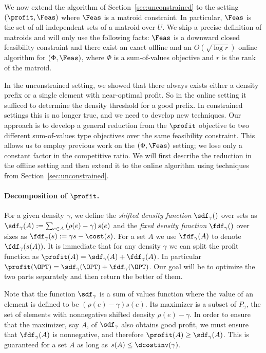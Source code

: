 We now extend the algorithm of Section~\ref{sec:unconstrained} to the
setting $(\profit, \Feas)$ where $\Feas$ is a matroid constraint. In
particular, $\Feas$ is the set of all independent sets of a matroid
over $U$. We skip a precise definition of matroids and will only use the following facts: $\Feas$ is a downward closed feasibility constraint and there exist an exact offline and an $O(\sqrt{\log r})$ online algorithm for
$(\Phi,\Feas)$, where $\Phi$ is a sum-of-values objective and $r$ is the rank of the matroid. 

In the unconstrained setting, we showed that there always exists either a density prefix or a single element with near-optimal profit. So in the online setting it sufficed to determine the density threshold for a good prefix. In constrained settings this is no longer true, and we need to develop new techniques. Our approach is to develop a general reduction from the $\profit$ objective to two different sum-of-values type objectives over the same feasibility constraint. This allows us to employ previous work on the $(\Phi,\Feas)$ setting; we lose only a constant factor in the competitive ratio. We will first describe the reduction in the offline setting and then extend it to the online algorithm using techniques from Section~\ref{sec:unconstrained}.

\paragraph{Decomposition of $\profit$.}

For a given density $\gamma$, we define the {\em shifted density
function} $\sdf_\gamma( )$ over sets as $ \sdf_\gamma(A)
:= \sum_{e \in A} \left(\rho(e) - \gamma \right) s(e) $ and the {\em
fixed density function} $\fdf_\gamma( )$ over sizes as
$ \fdf_\gamma(s) := \gamma s - \cost(s)$. For a set $A$ we use
$\fdf_\gamma(A)$ to denote $\fdf_\gamma(s(A))$. It is immediate that
for any density $\gamma$ we can split the profit function as
$\profit(A) = \sdf_\gamma(A) + \fdf_\gamma(A)$. In particular
$\profit(\OPT)= \sdf_{\gamma}(\OPT)+\fdf_{\gamma}(\OPT)$. Our goal
will be to optimize the two parts separately and then return the
better of them.

Note that the function $\sdf_{\gamma}$ is a sum of values function
where the value of an element is defined to be $(\rho(e) - \gamma)
s(e)$. Its maximizer is a subset of $P_\gamma$, the set of elements
with nonnegative shifted density $\rho(e)-\gamma$. In order to ensure
that the maximizer, say $A$, of $\sdf_{\gamma}$ also obtains good
profit, we must ensure that $\fdf_{\gamma}(A)$ is nonnegative, and
therefore $\profit(A)\ge \sdf_{\gamma}(A)$. This is guaranteed for a
set $A$ as long as $s(A)\le \dcostinv(\gamma)$.

